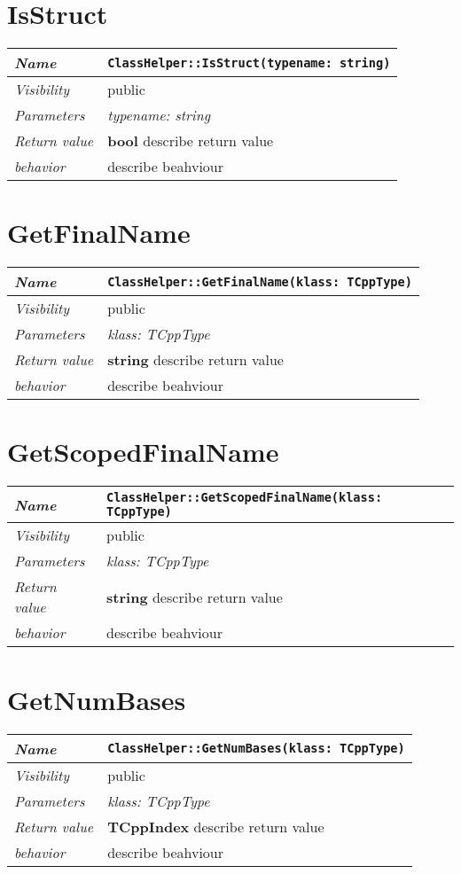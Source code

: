  \section{IsStruct}
\begin{longtable}{p{3cm} @{\hskip 1cm} p{12cm}}
 \hline
\textit{Name} & \texttt{ClassHelper::IsStruct(typename: string)}\\
\hline
 \textit{Visibility} & public\\
\hline
\textit{Parameters} & \textit{typename: string}\\
\hline
\textit{Return value} & \textbf{ bool} describe return value\\
  \hline
 \textit{behavior} & describe beahviour \\
\hline
\end{longtable} \pagebreak
 \section{GetFinalName}
\begin{longtable}{p{3cm} @{\hskip 1cm} p{12cm}}
 \hline
\textit{Name} & \texttt{ClassHelper::GetFinalName(klass: TCppType)}\\
\hline
 \textit{Visibility} & public\\
\hline
\textit{Parameters} & \textit{klass: TCppType}\\
\hline
\textit{Return value} & \textbf{ string} describe return value\\
  \hline
 \textit{behavior} & describe beahviour \\
\hline
\end{longtable} \pagebreak
 \section{GetScopedFinalName}
\begin{longtable}{p{3cm} @{\hskip 1cm} p{12cm}}
 \hline
\textit{Name} & \texttt{ClassHelper::GetScopedFinalName(klass: TCppType)}\\
\hline
 \textit{Visibility} & public\\
\hline
\textit{Parameters} & \textit{klass: TCppType}\\
\hline
\textit{Return value} & \textbf{ string} describe return value\\
  \hline
 \textit{behavior} & describe beahviour \\
\hline
\end{longtable} \pagebreak
 \section{GetNumBases}
\begin{longtable}{p{3cm} @{\hskip 1cm} p{12cm}}
 \hline
\textit{Name} & \texttt{ClassHelper::GetNumBases(klass: TCppType)}\\
\hline
 \textit{Visibility} & public\\
\hline
\textit{Parameters} & \textit{klass: TCppType}\\
\hline
\textit{Return value} & \textbf{ TCppIndex} describe return value\\
  \hline
 \textit{behavior} & describe beahviour \\
\hline
\end{longtable} \pagebreak

